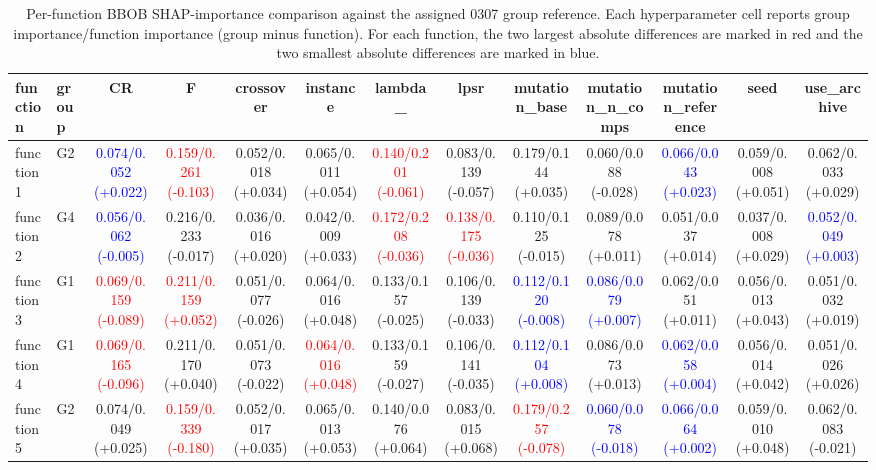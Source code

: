 \begin{table}[htbp]
\centering
\caption{Per-function BBOB SHAP-importance comparison against the assigned 0307 group reference. Each hyperparameter cell reports group importance/function importance (group minus function). For each function, the two largest absolute differences are marked in red and the two smallest absolute differences are marked in blue.}
\label{tab:bbob_function_group_shap_comparison}
\begin{adjustbox}{max width=\textwidth}
\begin{tabular}{llccccccccccc}
\toprule
function & group & CR & F & crossover & instance & lambda\_ & lpsr & mutation\_base & mutation\_n\_comps & mutation\_reference & seed & use\_archive \\
\midrule
function1 & G2 & \textcolor{blue}{0.074/0.052 (+0.022)} & \textcolor{red}{0.159/0.261 (-0.103)} & 0.052/0.018 (+0.034) & 0.065/0.011 (+0.054) & \textcolor{red}{0.140/0.201 (-0.061)} & 0.083/0.139 (-0.057) & 0.179/0.144 (+0.035) & 0.060/0.088 (-0.028) & \textcolor{blue}{0.066/0.043 (+0.023)} & 0.059/0.008 (+0.051) & 0.062/0.033 (+0.029) \\
function2 & G4 & \textcolor{blue}{0.056/0.062 (-0.005)} & 0.216/0.233 (-0.017) & 0.036/0.016 (+0.020) & 0.042/0.009 (+0.033) & \textcolor{red}{0.172/0.208 (-0.036)} & \textcolor{red}{0.138/0.175 (-0.036)} & 0.110/0.125 (-0.015) & 0.089/0.078 (+0.011) & 0.051/0.037 (+0.014) & 0.037/0.008 (+0.029) & \textcolor{blue}{0.052/0.049 (+0.003)} \\
function3 & G1 & \textcolor{red}{0.069/0.159 (-0.089)} & \textcolor{red}{0.211/0.159 (+0.052)} & 0.051/0.077 (-0.026) & 0.064/0.016 (+0.048) & 0.133/0.157 (-0.025) & 0.106/0.139 (-0.033) & \textcolor{blue}{0.112/0.120 (-0.008)} & \textcolor{blue}{0.086/0.079 (+0.007)} & 0.062/0.051 (+0.011) & 0.056/0.013 (+0.043) & 0.051/0.032 (+0.019) \\
function4 & G1 & \textcolor{red}{0.069/0.165 (-0.096)} & 0.211/0.170 (+0.040) & 0.051/0.073 (-0.022) & \textcolor{red}{0.064/0.016 (+0.048)} & 0.133/0.159 (-0.027) & 0.106/0.141 (-0.035) & \textcolor{blue}{0.112/0.104 (+0.008)} & 0.086/0.073 (+0.013) & \textcolor{blue}{0.062/0.058 (+0.004)} & 0.056/0.014 (+0.042) & 0.051/0.026 (+0.026) \\
function5 & G2 & 0.074/0.049 (+0.025) & \textcolor{red}{0.159/0.339 (-0.180)} & 0.052/0.017 (+0.035) & 0.065/0.013 (+0.053) & 0.140/0.076 (+0.064) & 0.083/0.015 (+0.068) & \textcolor{red}{0.179/0.257 (-0.078)} & \textcolor{blue}{0.060/0.078 (-0.018)} & \textcolor{blue}{0.066/0.064 (+0.002)} & 0.059/0.010 (+0.048) & 0.062/0.083 (-0.021) \\

\end{tabular}
\end{adjustbox}
\end{table}
